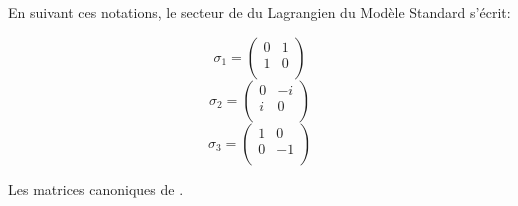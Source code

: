 En suivant ces notations, le secteur de  du Lagrangien du Modèle Standard s'écrit:
\marginpar
{
\begin{equation*}
\sigma_{1}=\begin{pmatrix} 
0&1\\
1&0\\
\end{pmatrix}
\end{equation*}
\vspace{0.2cm}
\begin{equation*}
\sigma_{2}=\begin{pmatrix} 
0&-i\\
i&0\\
\end{pmatrix}
\end{equation*}
\vspace{0.2cm}
\begin{equation*}
\sigma_{3}=\begin{pmatrix} 
1&0\\
0&-1\\
\end{pmatrix}
\end{equation*}
\captionsetup{type=figure}\caption{Les matrices canoniques de .}
\label{Pauli}
}
\marginpar
